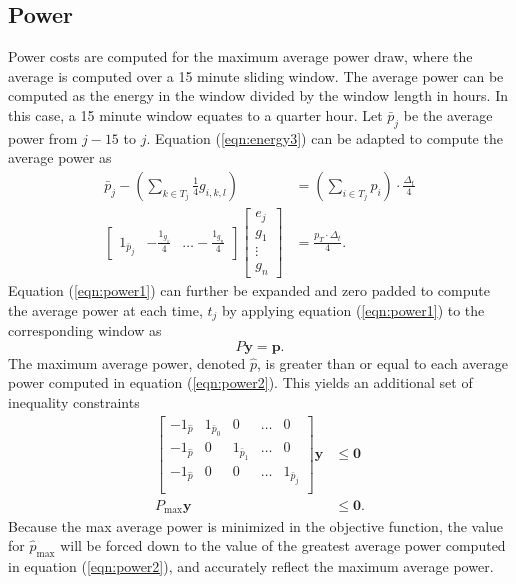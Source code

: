 \subsection{Power}
Power costs are computed for the maximum average power draw, where the average is computed over a 15 minute sliding window. The average power can be computed as the energy in the window divided by the window length in hours. In this case, a 15 minute window equates to a quarter hour. Let $\bar{p}_j$ be the average power from $j - 15$ to $j$. Equation (\ref{eqn:energy3}) can be adapted to compute the average power as
\begin{equation}\label{eqn:power1} 
	\begin{aligned}
		\bar{p}_j - \left ( \sum_{k\in T_j}\frac{1}{4}g_{i,k,l} \right ) &= \left ( \sum_{i\in T_j}p_i \right ) \cdot \frac{\Delta_t}{4} \\
		\begin{bmatrix} 1_{\bar{p}_j} & -\frac{1_{g_1}}{4} & \hdots -\frac{1_{g_n}}{4} \end{bmatrix} \begin{bmatrix}e_j \\ g_1 \\ \vdots \\ g_n \end{bmatrix} &= \frac{p_T \cdot \Delta_t}{4}.
	\end{aligned}
\end{equation}
Equation (\ref{eqn:power1}) can further be expanded and zero padded to compute the average power at each time, $t_j$ by applying equation (\ref{eqn:power1}) to the corresponding window as
\begin{equation}\label{eqn:power2}
	P\mathbf{y} = \mathbf{p}.	
\end{equation}
The maximum average power, denoted $\hat{p}$, is greater than or equal to each average power computed in equation (\ref{eqn:power2}).  This yields an additional set of inequality constraints 
\begin{equation}\label{eqn:cPower1}
	\begin{aligned}
		 \begin{bmatrix} 
			-1_{\hat{p}} & 1_{\bar{p}_0} & 0             & \hdots & 0 \\ 
	        	-1_{\hat{p}} & 0       & 1_{\bar{p}_1} & \hdots & 0\\
			-1_{\hat{p}} & 0       & 0 & \hdots    & 1_{\bar{p}_j} \\
		 \end{bmatrix}\mathbf{y} &\le \mathbf{0} \\ 
		 P_{\text{max}}\mathbf{y} &\le \mathbf{0}.
	\end{aligned}
\end{equation}
Because the max average power is minimized in the objective function, the value for $\hat{p}_{\text{max}}$ will be forced down to the value of the greatest average power computed in equation (\ref{eqn:power2}), and accurately reflect the maximum average power.
